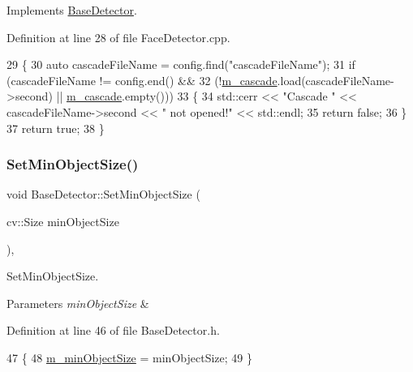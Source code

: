 Implements \mbox{\hyperlink{class_base_detector_a44c53608e9e4e3455ff553d987165260}{Base\+Detector}}.



Definition at line 28 of file Face\+Detector.\+cpp.


\begin{DoxyCode}
29 \{
30     \textcolor{keyword}{auto} cascadeFileName = config.find(\textcolor{stringliteral}{"cascadeFileName"});
31     \textcolor{keywordflow}{if} (cascadeFileName != config.end() &&
32             (!\mbox{\hyperlink{class_face_detector_ad1d3ea259a43c8806bc658273024929a}{m\_cascade}}.load(cascadeFileName->second) || \mbox{\hyperlink{class_face_detector_ad1d3ea259a43c8806bc658273024929a}{m\_cascade}}.empty()))
33     \{
34         std::cerr << \textcolor{stringliteral}{"Cascade "} << cascadeFileName->second << \textcolor{stringliteral}{" not opened!"} << std::endl;
35         \textcolor{keywordflow}{return} \textcolor{keyword}{false};
36     \}
37     \textcolor{keywordflow}{return} \textcolor{keyword}{true};
38 \}
\end{DoxyCode}
\mbox{\label{class_base_detector_ab459f4e77cf1110cc1ee84027f0f2a03}} 
\subsubsection{\texorpdfstring{Set\+Min\+Object\+Size()}{SetMinObjectSize()}}
{\footnotesize\ttfamily void Base\+Detector\+::\+Set\+Min\+Object\+Size (\begin{DoxyParamCaption}\item[{cv\+::\+Size}]{min\+Object\+Size }\end{DoxyParamCaption})\hspace{0.3cm}{\ttfamily [inline]}, {\ttfamily [inherited]}}



Set\+Min\+Object\+Size. 


\begin{DoxyParams}{Parameters}
{\em min\+Object\+Size} & \\
\hline
\end{DoxyParams}


Definition at line 46 of file Base\+Detector.\+h.


\begin{DoxyCode}
47     \{
48         \mbox{\hyperlink{class_base_detector_a651b938c89c94daac4763728637d90c9}{m\_minObjectSize}} = minObjectSize;
49     \}
\end{DoxyCode}


